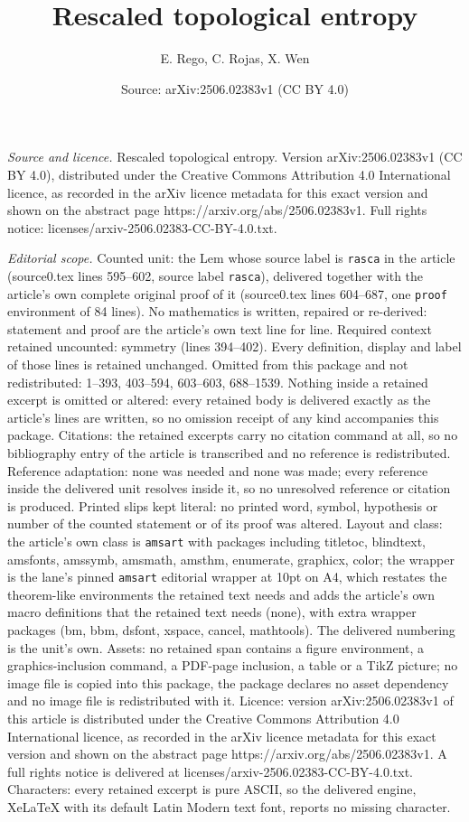 \documentclass[10pt,a4paper]{amsart}
\title[Rescaled topological entropy]{Rescaled topological entropy}
\author{E. Rego, C. Rojas, X. Wen}
\date{Source: arXiv:2506.02383v1 (CC BY 4.0)}
\begin{document}
\maketitle

\noindent\emph{Source and licence.} Rescaled topological entropy. Version arXiv:2506.02383v1 (CC BY 4.0), distributed under the Creative Commons Attribution 4.0 International licence, as recorded in the arXiv licence metadata for this exact version and shown on the abstract page https://arxiv.org/abs/2506.02383v1. Full rights notice: licenses/arxiv-2506.02383-CC-BY-4.0.txt.\par\smallskip

\noindent\textit{Editorial scope.} Counted unit: the Lem whose source label is \texttt{rasca} in the article (source0.tex lines 595--602, source label \texttt{rasca}), delivered together with the article's own complete original proof of it (source0.tex lines 604--687, one \texttt{proof} environment of 84 lines). No mathematics is written, repaired or re-derived: statement and proof are the article's own text line for line. Required context retained uncounted: symmetry (lines 394--402). Every definition, display and label of those lines is retained unchanged. Omitted from this package and not redistributed: 1--393, 403--594, 603--603, 688--1539. Nothing inside a retained excerpt is omitted or altered: every retained body is delivered exactly as the article's lines are written, so no omission receipt of any kind accompanies this package. Citations: the retained excerpts carry no citation command at all, so no bibliography entry of the article is transcribed and no reference is redistributed. Reference adaptation: none was needed and none was made; every reference inside the delivered unit resolves inside it, so no unresolved reference or citation is produced. Printed slips kept literal: no printed word, symbol, hypothesis or number of the counted statement or of its proof was altered. Layout and class: the article's own class is \texttt{amsart} with packages including titletoc, blindtext, amsfonts, amssymb, amsmath, amsthm, enumerate, graphicx, color; the wrapper is the lane's pinned \texttt{amsart} editorial wrapper at 10pt on A4, which restates the theorem-like environments the retained text needs and adds the article's own macro definitions that the retained text needs (none), with extra wrapper packages (bm, bbm, dsfont, xspace, cancel, mathtools). The delivered numbering is the unit's own. Assets: no retained span contains a figure environment, a graphics-inclusion command, a PDF-page inclusion, a table or a TikZ picture; no image file is copied into this package, the package declares no asset dependency and no image file is redistributed with it. Licence: version arXiv:2506.02383v1 of this article is distributed under the Creative Commons Attribution 4.0 International licence, as recorded in the arXiv licence metadata for this exact version and shown on the abstract page https://arxiv.org/abs/2506.02383v1. A full rights notice is delivered at licenses/arxiv-2506.02383-CC-BY-4.0.txt. Characters: every retained excerpt is pure ASCII, so the delivered engine, XeLaTeX with its default Latin Modern text font, reports no missing character.
\end{document}
